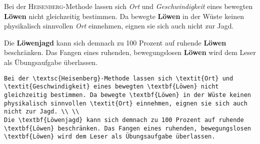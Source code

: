 \begin{frame}[fragile]
	\Losung
	\begin{outputbox}
		Bei der \textsc{Heisenberg}-Methode lassen sich \textit{Ort} und \textit{Geschwindigkeit} eines bewegten \textbf{Löwen} nicht gleichzeitig bestimmen. Da bewegte \textbf{Löwen} in der Wüste keinen physikalisch sinnvollen \textit{Ort} einnehmen, eignen sie sich auch nicht zur Jagd.
		
		Die \textbf{Löwenjagd} kann sich demnach zu 100 Prozent auf ruhende \textbf{Löwen} beschränken. Das Fangen eines ruhenden, bewegungslosen \textbf{Löwen} wird dem Leser als Übungsaufgabe überlassen.
	\end{outputbox}

	\Code
	\begin{lstlisting}[breaklines=true]
Bei der \textsc{Heisenberg}-Methode lassen sich \textit{Ort} und \textit{Geschwindigkeit} eines bewegten \textbf{Löwen} nicht gleichzeitig bestimmen. Da bewegte \textbf{Löwen} in der Wüste keinen
physikalisch sinnvollen \textit{Ort} einnehmen, eignen sie sich auch nicht zur Jagd. \\ \\
Die \textbf{Löwenjagd} kann sich demnach zu 100 Prozent auf ruhende \textbf{Löwen} beschränken. Das Fangen eines ruhenden, bewegungslosen \textbf{Löwen} wird dem Leser als Übungsaufgabe überlassen.
	\end{lstlisting}
\end{frame}
